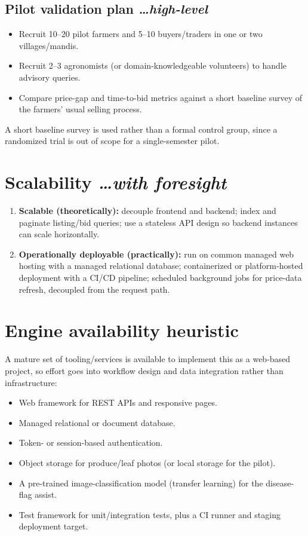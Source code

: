 \documentclass[11pt,a4paper]{article}
\newcommand{\BvrHint}[1]{%
  {\normalfont\normalsize\itshape\hfill #1}}
\begin{document}
\subsection{Pilot validation plan %
  \BvrHint{\ldots high-level}}
\begin{itemize}[leftmargin=0.7cm]
    \item Recruit 10--20 pilot farmers and 5--10 buyers/traders in one or two villages/mandis.
    \item Recruit 2--3 agronomists (or domain-knowledgeable volunteers) to handle advisory queries.
    \item Compare price-gap and time-to-bid metrics against a short baseline survey of the farmers' usual selling process.
\end{itemize}
A short baseline survey is used rather than a formal control group, since a randomized trial is out of scope for a single-semester pilot.

\section{Scalability %
  \BvrHint{\ldots with foresight}}
\begin{enumerate}[leftmargin=0.7cm]
    \item \textbf{Scalable (theoretically):} decouple frontend and backend; index and paginate listing/bid queries; use a stateless API design so backend instances can scale horizontally.
    \item \textbf{Operationally deployable (practically):} run on common managed web hosting with a managed relational database; containerized or platform-hosted deployment with a CI/CD pipeline; scheduled background jobs for price-data refresh, decoupled from the request path.
\end{enumerate}

\section{Engine availability heuristic}
A mature set of tooling/services is available to implement this as a web-based project, so effort goes into workflow design and data integration rather than infrastructure:
\begin{itemize}[leftmargin=0.7cm]
    \item Web framework for REST APIs and responsive pages.
    \item Managed relational or document database.
    \item Token- or session-based authentication.
    \item Object storage for produce/leaf photos (or local storage for the pilot).
    \item A pre-trained image-classification model (transfer learning) for the disease-flag assist.
    \item Test framework for unit/integration tests, plus a CI runner and staging deployment target.
\end{itemize}
\end{document}
